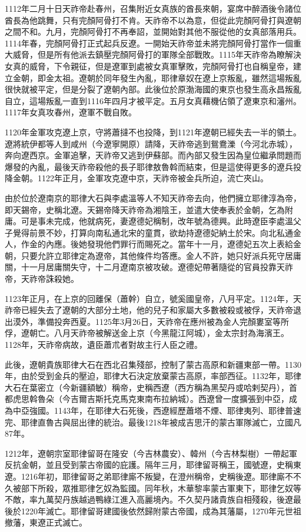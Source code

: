 1112年二月十日天祚帝赴春州，召集附近女真族的酋長來朝，宴席中醉酒後令諸位酋長為他跳舞，只有完顏阿骨打不肯。天祚帝不以為意，但從此完顏阿骨打與遼朝之間不和。九月，完顏阿骨打不再奉詔，並開始對其他不服從他的女真部落用兵。1114年春，完顏阿骨打正式起兵反遼。一開始天祚帝並未將完顏阿骨打當作一個重大威脅，但是所有他派去鎮壓完顏阿骨打的軍隊全部戰敗。1115年天祚帝為瞭解決女真的威脅，下令親征，但是遼軍到處被女真軍擊敗，完顏阿骨打也自稱皇帝，建立金朝，即金太祖。遼朝於同年發生內亂，耶律章奴在遼上京叛亂，雖然這場叛亂很快就被平定，但是分裂了遼朝內部。此後位於原渤海國的東京也發生高永昌叛亂自立，這場叛亂一直到1116年四月才被平定。五月女真藉機佔領了遼東京和瀋州。1117年女真攻春州，遼軍不戰自敗。

1120年金軍攻克遼上京，守將蕭撻不也投降，到1121年遼朝已經失去一半的領土。遼將統伊都等人到咸州（今遼寧開原）請降，天祚帝逃到鴛鴦濼（今河北赤城），奔向遼西京。金軍追擊，天祚帝又逃到伊蘇部。而內部又發生因為皇位繼承問題而爆發的內亂，最後天祚帝殺他的長子耶律敖魯斡而結束，但是這使得更多的遼兵投降金朝。1122年正月，金軍攻克遼中京，天祚帝被金兵所迫，流亡夾山。

由於位於遼南京的耶律大石與李處溫等人不知天祚帝去向，他們擁立耶律淳為帝，即天錫帝，史稱北遼。天錫帝降天祚帝為湘陰王，並遣大使奉表於金朝，乞為附庸。可是事未完成，他就病死，妻遼德妃稱制，改年號為德興。此時遼臣李處溫父子覺得前景不妙，打算向南私通北宋的童貫，欲劫持遼德妃納土於宋。向北私通金人，作金的內應。後她發現他們罪行而賜死之。當年十一月，遼德妃五次上表給金朝，只要允許立耶律定為遼帝，其他條件均答應。金人不許，她只好派兵死守居庸關，十一月居庸關失守，十二月遼南京被攻破。遼德妃帶著隨從的官員投靠天祚帝，天祚帝誅殺她。

1123年正月，在上京的回離保（蕭幹）自立，號奚國皇帝，八月平定。1124年，天祚帝已經失去了遼朝的大部分土地，他的兒子和家屬大多數被殺或被俘，天祚帝退出漠外，準備投奔西夏。1125年3月26日，天祚帝在應州被為金人完顏婁室等所俘，遼朝亡。八月天祚帝被解送金上京（今黑龍江阿城），金太宗封為海濱王。1128年，天祚帝病故，遺臣蕭朮者對故主行人臣之禮。

此後，遼朝貴族耶律大石在西北召集殘部，控制了蒙古高原和新疆東部一帶。1130年，由於受到金兵的壓迫，耶律大石決定放棄蒙古高原，率部西征。1132年，耶律大石在葉密立（今新疆額敏）稱帝，史稱西遼（西方稱為黑契丹或哈剌契丹），首都虎思斡魯朵（今吉爾吉斯托克馬克東南布拉納城）。西遼曾一度擴張到中亞，成為中亞強國。1143年，在耶律大石死後，西遼經歷蕭塔不煙、耶律夷列、耶律普速完、耶律直魯古與屈出律的統治。最後1218年被成吉思汗的蒙古軍隊滅亡，立國凡87年。

1212年，遼朝宗室耶律留哥在隆安（今吉林農安）、韓州（今吉林梨樹）一帶起軍反抗金朝，並且受到蒙古帝國的庇護。隔年三月，耶律留哥稱王，國號遼，史稱東遼。1216年初，耶律留哥之弟耶律廝不叛變，在澄州稱帝，史稱後遼。耶律廝不不久被部下所殺，眾推耶律乞奴為監國。同年秋，木華黎率蒙古軍東下，耶律乞奴等不敵，率九萬契丹族越過鴨綠江進入高麗境內。不久契丹諸貴族自相殘殺，後遼最後於1220年滅亡。耶律留哥建國後依然歸附蒙古帝國，成為其藩屬，1270年元世祖撤藩，東遼正式滅亡。

